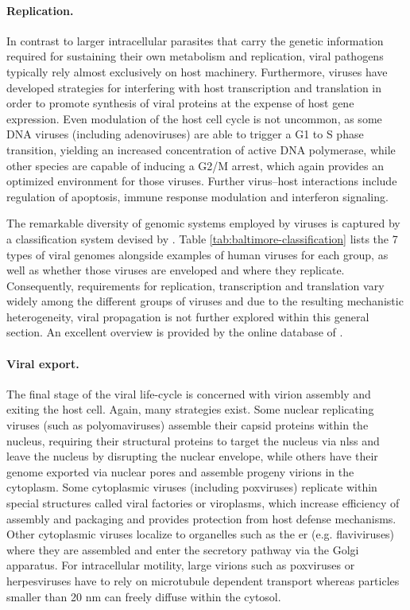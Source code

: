 \paragraph{Replication.}
In contrast to larger intracellular parasites that carry the genetic information required for sustaining their own metabolism and replication, viral pathogens typically rely almost exclusively on host machinery. Furthermore, viruses have developed strategies for interfering with host transcription and translation in order to promote synthesis of viral proteins at the expense of host gene expression. Even modulation of the host cell cycle is not uncommon, as some DNA viruses (including adenoviruses) are able to trigger a G1 to S phase transition, yielding an increased concentration of active DNA polymerase, while other species are capable of inducing a G2\slash M arrest, which again provides an optimized environment for those viruses. Further virus--host interactions include regulation of apoptosis, immune response modulation and interferon signaling.

The remarkable diversity of genomic systems employed by viruses is captured by a classification system devised by \cite{Baltimore1971}. Table \ref{tab:baltimore-classification} lists the 7 types of viral genomes alongside examples of human viruses for each group, as well as whether those viruses are enveloped and where they replicate. Consequently, requirements for replication, transcription and translation vary widely among the different groups of viruses and due to the resulting mechanistic heterogeneity, viral propagation is not further explored within this general section. An excellent overview is provided by the online database of \citeauthor{Hulo2011}.

\paragraph{Viral export.}
The final stage of the viral life-cycle is concerned with virion assembly and exiting the host cell. Again, many strategies exist. Some nuclear replicating viruses (such as polyomaviruses) assemble their capsid proteins within the nucleus, requiring their structural proteins to target the nucleus via \glspl{nls} and leave the nucleus by disrupting the nuclear envelope, while others have their genome exported via nuclear pores and assemble progeny virions in the cytoplasm. Some cytoplasmic viruses (including poxviruses) replicate within special structures called viral factories or viroplasms, which increase efficiency of assembly and packaging and provides protection from host defense mechanisms. Other cytoplasmic viruses localize to organelles such as the \gls{er} (e.g. flaviviruses) where they are assembled and enter the secretory pathway via the Golgi apparatus. For intracellular motility, large virions such as poxviruses or herpesviruses have to rely on microtubule dependent transport whereas particles smaller than 20 nm can freely diffuse within the cytosol.

